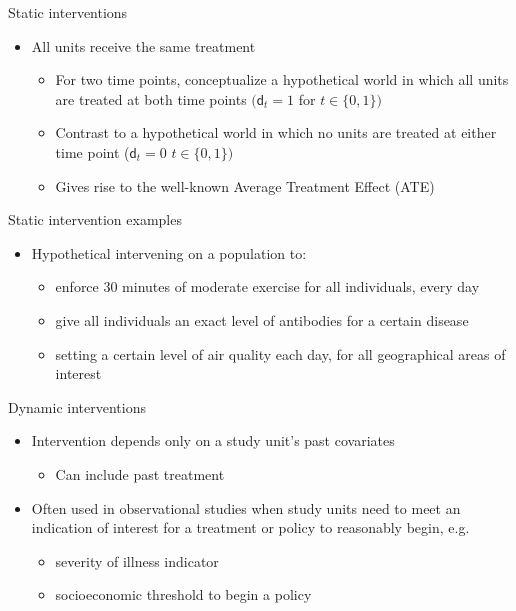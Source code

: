 \documentclass[
  10pt,
  ignorenonframetext,
]{beamer}
\providecommand{\tightlist}{%
  \setlength{\itemsep}{0pt}\setlength{\parskip}{0pt}}\usepackage{longtable,booktabs,array}
\begin{document}
\begin{frame}{Static interventions}
\protect\hypertarget{static-interventions}{}
\begin{itemize}
\item
  All units receive the same treatment

  \begin{itemize}
  \item
    For two time points, conceptualize a hypothetical world in which all
    units are treated at both time points \((\mathsf{d}_t = 1\) for
    \(t \in \{0, 1\})\)
  \item
    Contrast to a hypothetical world in which no units are treated at
    either time point (\(\mathsf{d}_t = 0\) \(t \in \{0, 1\})\)
  \item
    Gives rise to the well-known Average Treatment Effect (ATE)
  \end{itemize}
\end{itemize}
\end{frame}

\begin{frame}{Static intervention examples}
\protect\hypertarget{static-intervention-examples}{}
\begin{itemize}
\tightlist
\item
  Hypothetical intervening on a population to:

  \begin{itemize}
  \tightlist
  \item
    enforce 30 minutes of moderate exercise for all individuals, every
    day
  \item
    give all individuals an exact level of antibodies for a certain
    disease
  \item
    setting a certain level of air quality each day, for all
    geographical areas of interest
  \end{itemize}
\end{itemize}
\end{frame}

\begin{frame}{Dynamic interventions}
\protect\hypertarget{dynamic-interventions}{}
\begin{itemize}
\tightlist
\item
  Intervention depends only on a study unit's past covariates

  \begin{itemize}
  \tightlist
  \item
    Can include past treatment
  \end{itemize}
\item
  Often used in observational studies when study units need to meet an
  indication of interest for a treatment or policy to reasonably begin,
  e.g.

  \begin{itemize}
  \tightlist
  \item
    severity of illness indicator
  \item
    socioeconomic threshold to begin a policy
  \end{itemize}
\end{itemize}
\end{frame}
\end{document}
